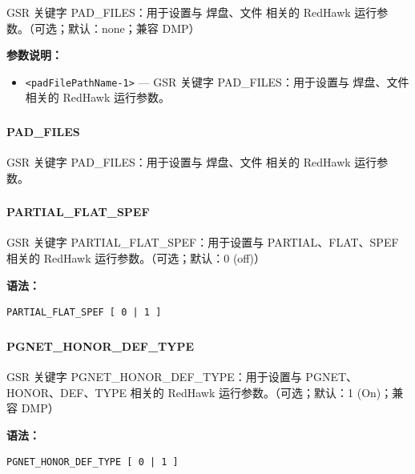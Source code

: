 GSR 关键字 PAD_FILES：用于设置与 焊盘、文件 相关的 RedHawk 运行参数。（可选；默认：none；兼容 DMP）

\textbf{参数说明：}
\begin{itemize}
\item \texttt{<padFilePathName-1>} — GSR 关键字 PAD\_FILES：用于设置与 焊盘、文件 相关的 RedHawk 运行参数。
\end{itemize}

\subsubsection{}
\paragraph*{PAD_FILES}

GSR 关键字 PAD_FILES：用于设置与 焊盘、文件 相关的 RedHawk 运行参数。

\subsubsection{}
\paragraph*{PARTIAL_FLAT_SPEF}

GSR 关键字 PARTIAL_FLAT_SPEF：用于设置与 PARTIAL、FLAT、SPEF 相关的 RedHawk 运行参数。（可选；默认：0 (off)）

\textbf{语法：}
\begin{lstlisting}
PARTIAL_FLAT_SPEF [ 0 | 1 ]
\end{lstlisting}

\subsubsection{}
\paragraph*{PGNET_HONOR_DEF_TYPE}

GSR 关键字 PGNET_HONOR_DEF_TYPE：用于设置与 PGNET、HONOR、DEF、TYPE 相关的 RedHawk 运行参数。（可选；默认：1 (On)；兼容 DMP）

\textbf{语法：}
\begin{lstlisting}
PGNET_HONOR_DEF_TYPE [ 0 | 1 ]
\end{lstlisting}

\subsubsection{}
